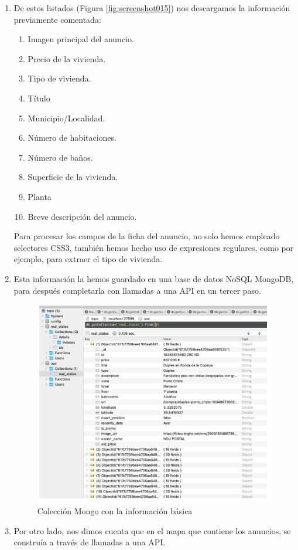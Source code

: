 \documentclass[a4paper, 12pt]{article}
\begin{document}
\begin{enumerate}
	\item De estos listados (Figura \ref{fig:screenshot015}) nos descargamos la información previamente comentada:
		\begin{enumerate}[1.]
			\item Imagen principal del anuncio.
			\item Precio de la vivienda.
			\item Tipo de vivienda.
			\item Título
			\item Municipio/Localidad.
			\item Número de habitaciones.
			\item Número de baños.
			\item Superficie de la vivienda.
			\item Planta
			\item Breve descripción del anuncio.			
		\end{enumerate}

	Para procesar los campos de la ficha del anuncio, no solo hemos empleado selectores CSS3, también hemos hecho uso de expresiones regulares, como por ejemplo, para extraer el tipo de vivienda.
	
	\item  Esta información la hemos guardado en una base de datos NoSQL MongoDB, para después completarla con llamadas a una API en un tercer paso.
	
	\begin{figure}[H]
		\centering
		\includegraphics[width=0.7\linewidth]{img/screenshot016}
		\caption{Colección Mongo con la información básica}
		\label{fig:screenshot016}
	\end{figure}
	
	\item Por otro lado, nos dimos cuenta que en el mapa que contiene los anuncios, se construía a través de llamadas a una API.
	

\end{enumerate}
\end{document}
